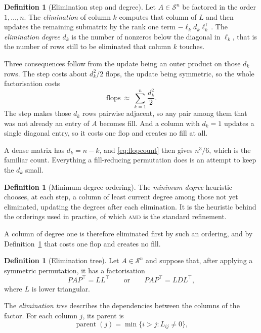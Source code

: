\documentclass[a4paper,11pt]{book}
\theoremstyle{plain}
\theoremstyle{definition}
\newtheorem{definition}[theorem]{Definition}
\theoremstyle{remark}
\numberwithin{equation}{chapter}
\numberwithin{algorithm}{chapter}
\newcommand{\Sp}{\mathcal{S}}
\begin{document}
	\begin{definition}[Elimination step and degree]\label{def:elimdegree}
		Let $A\in\Sp^n$ be factored in the order $1,\dots,n$. The \emph{elimination}
		of column $k$ computes that column of $L$ and then updates the remaining
		submatrix by the rank one term $-\ell_kd_k\ell_k^{\top}$. The
		\emph{elimination degree} $d_k$ is the number of nonzeros below the diagonal
		in $\ell_k$, that is the number of rows still to be eliminated that column
		$k$ touches.

		Three consequences follow from the update being an outer product on those
		$d_k$ rows. The step costs about $d_k^2/2$ flops, the update being
		symmetric, so the whole factorisation costs
		\begin{equation}\label{eq:flopcount}
			\text{flops}\ \approx\ \sum_{k=1}^{n}\frac{d_k^2}{2} .
		\end{equation}
		The step makes those $d_k$ rows pairwise adjacent, so any pair among them
		that was not already an entry of $A$ becomes fill. And a column with
		$d_k=1$ updates a single diagonal entry, so it costs one flop and creates
		no fill at all.
	\end{definition}

	A dense matrix has $d_k=n-k$, and \eqref{eq:flopcount} then gives $n^3/6$,
	which is the familiar count. Everything a fill-reducing permutation does is an
	attempt to keep the $d_k$ small.

	\begin{definition}[Minimum degree ordering]\label{def:mindegree}
		The \emph{minimum degree} heuristic chooses, at each step, a column of least
		current degree among those not yet eliminated, updating the degrees after
		each elimination. It is the heuristic behind the orderings used in practice,
		of which \textsc{amd} is the standard refinement.
	\end{definition}

	A column of degree one is therefore eliminated first by such an ordering, and
	by Definition~\ref{def:elimdegree} that costs one flop and creates no fill.

	\begin{definition}[Elimination tree]
		Let $A\in\Sp^n$ and suppose that, after applying a symmetric permutation, it
		has a factorisation
		\[
		PAP^\top=LL^\top
		\qquad\text{or}\qquad
		PAP^\top=LDL^\top,
		\]
		where $L$ is lower triangular.
		
		The \emph{elimination tree} describes the dependencies between the columns of
		the factor. For each column $j$, its parent is
		\[
		\operatorname{parent}(j)
		=
		\min\{i>j:L_{ij}\neq0\},
		\]
		
	\end{definition}
	
\end{document}
